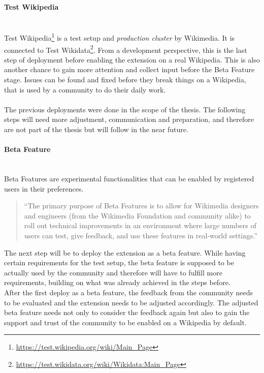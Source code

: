 \paragraph{Test Wikipedia} ~\\
Test Wikipedia\footnote{\url{https://test.wikipedia.org/wiki/Main_Page}} is a test setup and \textit{production cluster} by Wikimedia. It is connected to Test Wikidata\footnote{\url{https://test.wikidata.org/wiki/Wikidata:Main_Page}}. From a development perspective, this is the last step of deployment before enabling the extension on a real Wikipedia. This is also another chance to gain more attention and collect input before the Beta Feature stage. Issues can be found and fixed before they break things on a Wikipedia, that is used by a community to do their daily work. \\
\\
The previous deployments were done in the scope of the thesis. The following steps will need more adjustment, communication and preparation, and therefore are not part of the thesis but will follow in the near future. 

\paragraph{Beta Feature} ~\\
Beta Features are experimental functionalities that can be enabled by registered users in their preferences. 
\begin{quotation}
	``The primary purpose of Beta Features is to allow for Wikimedia designers and engineers (from the Wikimedia Foundation and community alike) to roll out technical improvements in an environment where large numbers of users can test, give feedback, and use these features in real-world settings.'' \citep{wiki:04}
\end{quotation} 

The next step will be to deploy the extension as a beta feature. While having certain requirements for the test setup, the beta feature is supposed to be actually used by the community and therefore will have to fulfill more requirements, building on what was already achieved in the steps before. \\
After the first deploy as a beta feature, the feedback from the community needs to be evaluated and the extension needs to be adjusted accordingly. The adjusted beta feature needs not only to consider the feedback again but also to gain the support and trust of the community to be enabled on a Wikipedia by default.

